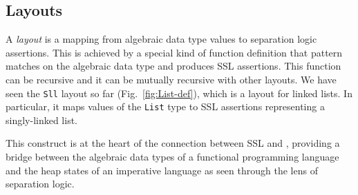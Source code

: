 \subsection{Layouts}
\label{sec:layouts}

A \textit{layout} is a mapping from algebraic data type values to separation logic assertions. This is achieved by a special kind of function definition that pattern matches on the algebraic data type and produces SSL assertions. This function can be recursive and it can be mutually recursive with other layouts. We have seen the \verb|Sll| layout so far (Fig.~\ref{fig:List-def}), which is a layout for linked lists. In particular, it maps values of the \verb|List| type to SSL assertions representing a singly-linked list.

This construct is at the heart of the connection between SSL and \Pika, providing a bridge between the algebraic data types of a functional programming language and the heap states of an imperative language as seen through the lens of separation logic.

